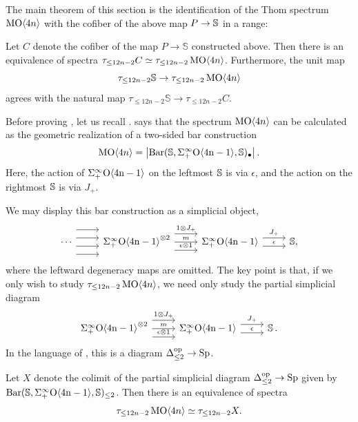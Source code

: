 The main theorem of this section is the identification of the Thom spectrum $\operatorname{\mathrm{MO}} \langle 4n \rangle$ with the cofiber of the above map $P \to \operatorname{\mathbb{S}}$ in a range:

\begin{thm} \label{thm:cofiber}
Let $C$ denote the  cofiber of the map $P \to \mathbb{S}$ constructed above.
Then there is an equivalence of spectra $\tau_{\le 12n-2} C \simeq \tau_{\le 12n-2} \operatorname{\mathrm{MO}} \langle 4n \rangle$.  Furthermore, the unit map
$$\tau_{\le 12n-2} \mathbb{S} \to \tau_{\le 12n-2} \operatorname{\mathrm{MO}} \langle 4n \rangle$$ agrees with the natural map $\tau_{\le 12n-2} \mathbb{S} \to \tau_{\le 12n-2} C$.
\end{thm}

Before proving , let us recall .   says that the spectrum $\operatorname{\mathrm{MO}} \langle 4n \rangle$ can be calculated as the geometric realization of a two-sided bar construction
$$\operatorname{\mathrm{MO}} \langle 4n \rangle = \left|\operatorname{\mathrm{Bar}}(\operatorname{\mathbb{S}},\Sigma^{\infty}_+ \mathrm{O \langle 4n-1\rangle}, \operatorname{\mathbb{S}})_{\bullet} \right|.$$
Here, the action of $\Sigma^{\infty}_+ \mathrm{O \langle 4n-1\rangle}$ on the leftmost $\operatorname{\mathbb{S}}$ is via $\epsilon$, and the action on the rightmost $\operatorname{\mathbb{S}}$ is via $J_+$.

We may display this bar construction as a simplicial object,
$$
\begin{tikzcd}
\cdots \arrow[r,yshift=-3ex] \arrow[r,yshift=-1ex] \arrow[r,yshift=1ex] \arrow[r,yshift=3ex]
& \spOf^{\otimes 2} \arrow[r,yshift=-2ex,"\epsilon \otimes 1"] \arrow[r,"m"] \arrow[r,yshift=2ex,"1 \otimes J_+"]
& \spOf \arrow[r,yshift=-1ex,"\epsilon"] \arrow[r,yshift=1ex, "J_+"] 
& \bS,
\end{tikzcd}
$$
where the leftward degeneracy maps are omitted.  The key point is that, if we only wish to study $\tau_{\le 12n-2} \operatorname{\mathrm{MO}} \langle 4n \rangle$, we need only study the partial simplicial diagram
$$
\begin{tikzcd}
\spOf^{\otimes 2} \arrow[r,yshift=-2ex,"\epsilon \otimes 1"] \arrow[r,"m"] \arrow[r,yshift=2ex,"1 \otimes J_+"]
& \spOf \arrow[r,yshift=-1ex,"\epsilon"] \arrow[r,yshift=1ex, "J_+"] 
& \bS.
\end{tikzcd}
$$
In the language of \cite[Lemma 1.2.4.17]{HA}, this is a diagram $\Delta^{\text{op}}_{\le 2} \to \operatorname{\mathrm{Sp}}$.

\begin{lem} \label{lem:partialbar}
Let $X$ denote the  colimit of the partial simplicial diagram $\Delta^{\mathrm{op}}_{\le 2} \to \operatorname{\mathrm{Sp}}$ given by $\mathrm{Bar}(\operatorname{\mathbb{S}},\Sigma^{\infty}_+ \mathrm{O \langle 4n-1\rangle},\operatorname{\mathbb{S}})_{\le 2}$.  Then there is an equivalence of spectra $$\tau_{\le 12n-2} \operatorname{\mathrm{MO}} \langle 4n \rangle \simeq \tau_{\le 12n-2} X.$$
\end{lem}


